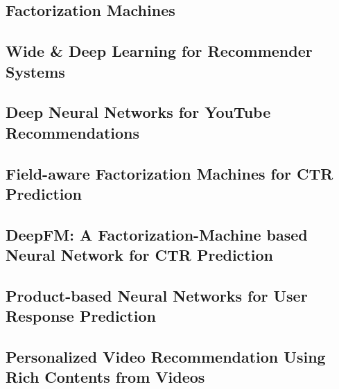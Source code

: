 \subsection{Factorization Machines}


\subsection{Wide \& Deep Learning for Recommender Systems}


\subsection{Deep Neural Networks for YouTube Recommendations}


\subsection{Field-aware Factorization Machines for CTR Prediction}


\subsection{DeepFM: A Factorization-Machine based Neural Network for CTR Prediction}


\subsection{Product-based Neural Networks for User Response Prediction}


\subsection{Personalized Video Recommendation Using Rich Contents from Videos}
